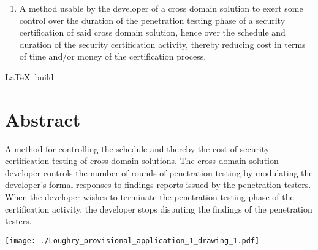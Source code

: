 \documentclass[12pt,letterpaper]{article}
\begin{document}
\begin{enumerate}
	\item A method usable by the developer of a cross domain solution to exert some control
		over the duration of the penetration testing phase of a security certification of
		said cross domain solution, hence over the schedule and duration of the security
		certification activity, thereby reducing cost in terms of time and/or money of
		the certification process.
\end{enumerate}

\newpage


\vfill\noindent
{\tiny \LaTeX\ build }

\newpage

\section*{Abstract}

A method for controlling the schedule and thereby the cost of security certification testing
of cross domain solutions.  The cross domain solution developer controls the number of rounds
of penetration testing by modulating the developer's formal responses to findings reports
issued by the penetration testers.  When the developer wishes to terminate the penetration
testing phase of the certification activity, the developer stops disputing the findings of
the penetration testers.

\newpage

\texttt{[image: ./Loughry\_provisional\_application\_1\_drawing\_1.pdf]}
\end{document}
